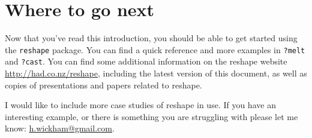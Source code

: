 \documentclass[oneside,letterpaper]{scrartcl}
\begin{document}
\newpage
\section{Where to go next}

Now that you've read this introduction, you should be able to get started using the {\tt reshape} package.  You can find a quick reference and more examples in {\tt ?melt} and {\tt ?cast}.   You can find some additional information on the reshape website \url{http://had.co.nz/reshape}, including the latest version of this document, as well as  copies of presentations and papers related to reshape.  

I would like to include more case studies of reshape in use.  If you have an interesting example, or there is something you are struggling with please let me know: \href{mailto:h.wickham@gmail.com}{h.wickham@gmail.com}.
\end{document}
